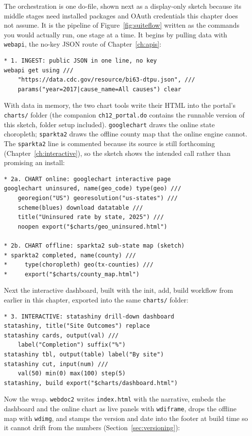 \documentclass[
    a4paper,
    fontsize=10pt,
    twoside=true,
    numbers=noenddot,
]{kaobook}
\begin{document}
The orchestration is one do-file, shown next as a display-only sketch because its middle stages need installed packages and OAuth credentials this chapter does not assume. It is the pipeline of Figure~\ref{fig:suiteflow} written as the commands you would actually run, one stage at a time. It begins by pulling data with \texttt{webapi}, the no-key JSON route of Chapter~\ref{ch:apis}:
\par
{\footnotesize
\begin{verbatim}
* 1. INGEST: public JSON in one line, no key
webapi get using ///
    "https://data.cdc.gov/resource/bi63-dtpu.json", ///
    params("year=2017|cause_name=All causes") clear
\end{verbatim}
}
With data in memory, the two chart tools write their HTML into the portal's \texttt{charts/} folder (the companion \texttt{ch12\_portal.do} contains the runnable version of this sketch, folder setup included). \texttt{googlechart} draws the online state choropleth; \texttt{sparkta2} draws the offline county map that the online engine cannot. The \texttt{sparkta2} line is commented because its source is still forthcoming (Chapter~\ref{ch:interactive}), so the sketch shows the intended call rather than promising an install:
\par
{\footnotesize
\begin{verbatim}
* 2a. CHART online: googlechart interactive page
googlechart uninsured, name(geo_code) type(geo) ///
    georegion("US") georesolution("us-states") ///
    scheme(blues) download datatable ///
    title("Uninsured rate by state, 2025") ///
    noopen export("$charts/geo_uninsured.html")

* 2b. CHART offline: sparkta2 sub-state map (sketch)
* sparkta2 completed, name(county) ///
*     type(choropleth) geo(tx-counties) ///
*     export("$charts/county_map.html")
\end{verbatim}
}
Next the interactive dashboard, built with the init, add, build workflow from earlier in this chapter, exported into the same \texttt{charts/} folder:
\par
{\footnotesize
\begin{verbatim}
* 3. INTERACTIVE: statashiny drill-down dashboard
statashiny, title("Site Outcomes") replace
statashiny cards, output(val) ///
    label("Completion") suffix("%")
statashiny tbl, output(table) label("By site")
statashiny cut, input(num) ///
    val(50) min(0) max(100) step(5)
statashiny, build export("$charts/dashboard.html")
\end{verbatim}
}
Now the wrap. \texttt{webdoc2} writes \texttt{index.html} with the narrative, embeds the dashboard and the online chart as live panels with \texttt{wdiframe}, drops the offline map with \texttt{wdimg}, and stamps the version and date into the footer at build time so it cannot drift from the numbers (Section~\ref{sec:versioning}):
\end{document}
